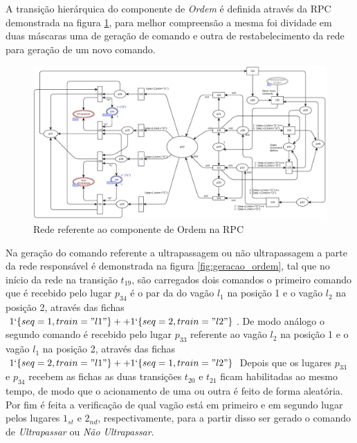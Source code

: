 A transição hierárquica do componente de \textit{Ordem} é definida através da RPC demonstrada na figura \ref{fig:ordem}, para melhor compreensão a mesma foi dividade em duas máscaras uma de geração de comando e outra de restabelecimento da rede para geração de um novo comando.

\begin{figure}[ht]
    \centering
    \caption{Rede referente ao componente de Ordem na RPC}
    \label{fig:ordem}
    \includegraphics[width=1\linewidth]{figures//Simulation//Modelagem/ordem.eps}
\end{figure}

Na geração do comando referente a ultrapassagem ou não ultrapassagem a parte da rede responsável é demonstrada na figura \ref{fig:geracao_ordem}, tal que no início da rede na transição $t_{19}$, são carregados dois comandos o primeiro comando que é recebido pelo lugar $p_{34}$ é o par da do vagão $l_1$ na posição 1 e o vagão $l_2$ na posição 2, através das fichas $1`\{seq=1,train="l1"\} ++ 1`\{seq=2,train="l2"\}$. De modo análogo o segundo comando é recebido pelo lugar $p_{33}$ referente ao vagão $l_2$ na posição 1 e o vagão $l_1$ na posição 2, através das fichas $1`\{seq=2,train="l1"\} ++ 1`\{seq=1,train="l2"\}$
Depois que os lugares $p_{33}$ e $p_{34}$ recebem as fichas as duas transições $t_{20}$ e $t_{21}$ ficam habilitadas ao mesmo tempo, de modo que o acionamento de uma ou outra é feito de forma aleatória. Por fim é feita a verificação de qual vagão está em primeiro e em segundo lugar pelos lugares $1_{st}$ e $2_{nd}$, respectivamente, para a partir disso ser gerado o comando de \textit{Ultrapassar} ou \textit{Não Ultrapassar}.

